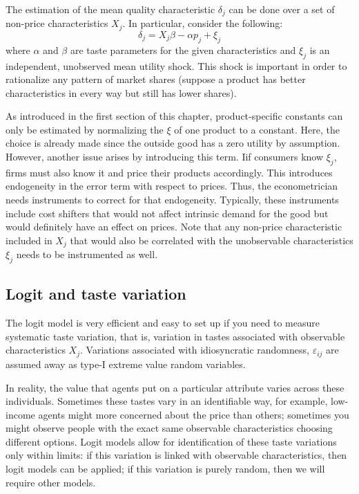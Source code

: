 The estimation of the mean quality characteristic $\delta_j$ can be done over a set of non-price characteristics $X_j$. In particular, consider the following:
$$ \delta_j = X_j\beta - \alpha p_j + \xi_j $$ where $\alpha$ and $\beta$ are taste parameters for the given characteristics and $\xi_j$ is an independent, unobserved mean utility shock. This shock is important in order to rationalize any pattern of market shares (suppose a product has better characteristics in every way but still has lower shares).

As introduced in the first section of this chapter, product-specific constants can only be estimated by normalizing the $\xi$ of one product to a constant. Here, the choice is already made since the outside good has a zero utility by assumption. However, another issue arises by introducing this term. Iif consumers know $\xi_j$, firms must also know it and price their products accordingly. This introduces endogeneity in the error term with respect to prices. Thus, the econometrician needs instruments to correct for that endogeneity. Typically, these instruments include cost shifters that would not affect intrinsic demand for the good but would definitely have an effect on prices. Note that any non-price characteristic included in $X_j$ that would also be correlated with the unobservable characteristics $\xi_j$ needs to be instrumented as well.

\subsection{Logit and taste variation}\label{sssec:tastevar}

The logit model is very efficient and easy to set up if you need to measure systematic taste variation, that is, variation in tastes associated with observable characteristics $X_j$. Variations associated with idiosyncratic randomness, $\varepsilon_{ij}$ are assumed away as type-I extreme value random variables.

In reality, the value that agents put on a particular attribute varies across these individuals. Sometimes these tastes vary in an identifiable way, for example, low-income agents might more concerned about the price than others; sometimes you might observe people with the exact same observable characteristics choosing different options. Logit models allow for identification of these taste variations only within limits: if this variation is linked with observable characteristics, then logit models can be applied; if this variation is purely random, then we will require other models.

